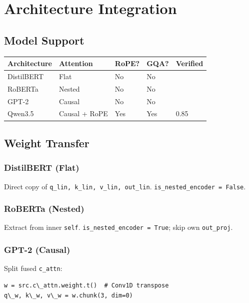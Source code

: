
\section{Architecture Integration}

\subsection{Model Support}

\begin{table}[H]
\centering
\small
\begin{tabular}{lllll}
\toprule
\textbf{Architecture} & \textbf{Attention} & \textbf{RoPE?} & \textbf{GQA?} & \textbf{Verified} \\
\midrule
DistilBERT & Flat & No & No &  \\
RoBERTa & Nested & No & No &  \\
GPT-2 & Causal & No & No &  \\
Qwen3.5 & Causal + RoPE & Yes & Yes & 0.85 \\
\bottomrule
\end{tabular}
\end{table}

\subsection{Weight Transfer}

\subsubsection{DistilBERT (Flat)}

Direct copy of \texttt{q\_lin, k\_lin, v\_lin, out\_lin}. \texttt{is\_nested\_encoder = False}.

\subsubsection{RoBERTa (Nested)}

Extract from inner \texttt{self}. \texttt{is\_nested\_encoder = True}; skip own \texttt{out\_proj}.

\subsubsection{GPT-2 (Causal)}

Split fused \texttt{c\_attn}:

\begin{lstlisting}
w = src.c\_attn.weight.t()  # Conv1D transpose
q\_w, k\_w, v\_w = w.chunk(3, dim=0)
\end{lstlisting}

